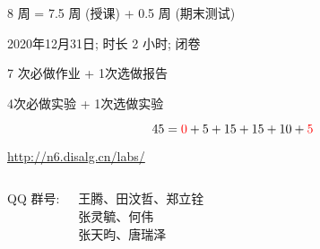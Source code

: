 
\begin{frame}{}
  \begin{center}
    {\large 8 周 = 7.5 周 (授课) + 0.5 周 (期末测试)}
  \end{center}

\end{frame}

\begin{frame}{}
  \begin{center}
     2020年12月31日; 时长 2 小时; 闭卷
    \vspace{1.00cm}

     7 次必做作业 + 1次选做报告 

    \vspace{1.00cm}
     4次必做实验 + 1次选做实验 
  \end{center}
\end{frame}

\begin{frame}{}
  \[
    45 = \textcolor{red}{0} + 5 + 15 + 15 + 10 + \textcolor{red}{5}
  \]

  \vspace{0.30cm}
  \begin{center}
    \url{http://n6.disalg.cn/labs/}
  \end{center}
\end{frame}

% 

\begin{frame}{}
  \begin{columns}
      \begin{center}
        QQ 群号: 

      \end{center}
      \begin{center}
         王腾、田汶哲、郑立铨 \\[15pt]
         张灵毓、何伟 \\[15pt]
         张天昀、唐瑞泽
      \end{center}
  \end{columns}
\end{frame}

